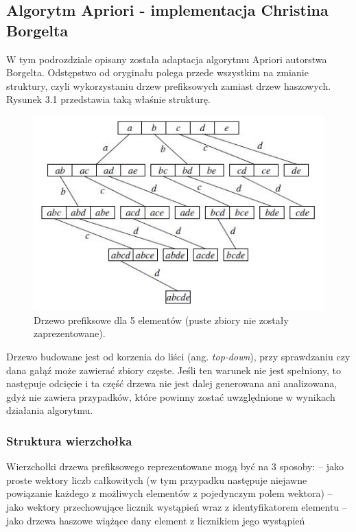 \subsection{Algorytm Apriori - implementacja Christina Borgelta \cite{Borgelt}}
\label{c322}
W tym podrozdziale opisany została adaptacja algorytmu Apriori autorstwa Borgelta. Odstępstwo od oryginału polega przede wszystkim na zmianie struktury, czyli wykorzystaniu drzew prefiksowych zamiast drzew haszowych. Rysunek 3.1 przedstawia taką właśnie strukturę. 
\begin{figure}[h]
\centering
\includegraphics[width=0.8\linewidth]{figures/prefixTreeBorgelt}
\caption[Rysunek 3.1]{Drzewo prefiksowe dla 5 elementów (puste zbiory nie zostały zaprezentowane).}
\label{fig:prefixTreeBorgelt}
\end{figure}
Drzewo budowane jest od korzenia do liści (ang. \textit{top-down}), przy sprawdzaniu czy dana gałąź może zawierać zbiory częste. Jeśli ten warunek nie jest spełniony, to następuje odcięcie i ta część drzewa nie jest dalej generowana ani analizowana, gdyż nie zawiera przypadków, które powinny zostać uwzględnione w wynikach działania algorytmu. 

\subsubsection*{Struktura wierzchołka}
Wierzchołki drzewa prefiksowego reprezentowane mogą być na 3 sposoby:\newline
-- jako proste wektory liczb całkowitych (w tym przypadku następuje niejawne powiązanie każdego z możliwych elementów z pojedynczym polem wektora)\newline
-- jako wektory przechowujące licznik wystąpień wraz z identyfikatorem elementu\newline
-- jako drzewa haszowe wiążące dany element z licznikiem jego wystąpień

